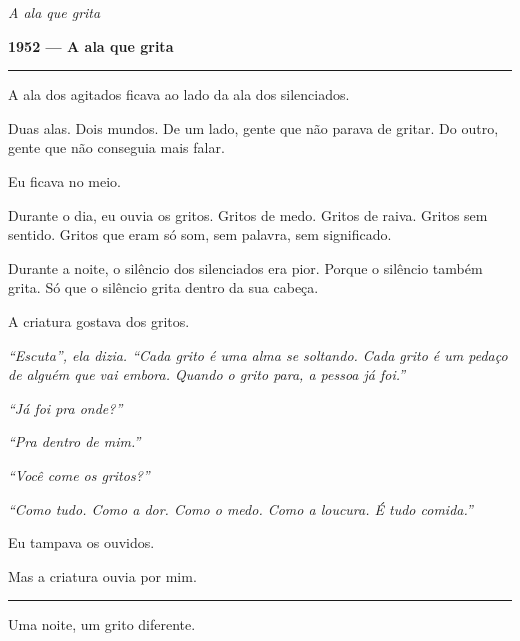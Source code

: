 
\noindent \textit{A ala que grita}

\noindent \textbf{1952 --- A ala que grita}

\vspace{0.5em}\noindent\rule{\textwidth}{0.5pt}\vspace{0.5em}

\noindent A ala dos agitados ficava ao lado da ala dos silenciados.

\noindent Duas alas. Dois mundos. De um lado, gente que não parava de gritar. Do outro, gente que não conseguia mais falar.

\noindent Eu ficava no meio.

\noindent Durante o dia, eu ouvia os gritos. Gritos de medo. Gritos de raiva. Gritos sem sentido. Gritos que eram só som, sem palavra, sem significado.

\noindent Durante a noite, o silêncio dos silenciados era pior. Porque o silêncio também grita. Só que o silêncio grita dentro da sua cabeça.

\noindent A criatura gostava dos gritos.

\noindent \textit{\textquotedblleft{}Escuta\textquotedblright{}\textit{, ela dizia. }\textquotedblleft{}Cada grito é uma alma se soltando. Cada grito é um pedaço de alguém que vai embora. Quando o grito para, a pessoa já foi.\textquotedblright{}}

\noindent \textit{\textquotedblleft{}Já foi pra onde?\textquotedblright{}}

\noindent \textit{\textquotedblleft{}Pra dentro de mim.\textquotedblright{}}

\noindent \textit{ \textquotedblleft{}Você come os gritos?\textquotedblright{}}

\noindent \textit{\textquotedblleft{}Como tudo. Como a dor. Como o medo. Como a loucura. É tudo comida.\textquotedblright{}}

\noindent Eu tampava os ouvidos.

\noindent Mas a criatura ouvia por mim.

\vspace{0.5em}\noindent\rule{\textwidth}{0.5pt}\vspace{0.5em}

\noindent Uma noite, um grito diferente.

